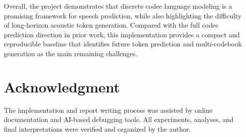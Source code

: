 \documentclass{article}
\begin{document}
	Overall, the project demonstrates that discrete codec language modeling is a promising framework for speech prediction, while also highlighting the difficulty of long-horizon acoustic token generation. Compared with the full codec prediction direction in prior work, this implementation provides a compact and reproducible baseline that identifies future token prediction and multi-codebook generation as the main remaining challenges.
	
	\section{Acknowledgment}
	\label{sec:ack}
	
	The implementation and report writing process was assisted by online documentation and AI-based debugging tools. All experiments, analyses, and final interpretations were verified and organized by the author.
	
	\vfill\pagebreak
	
\end{document}
